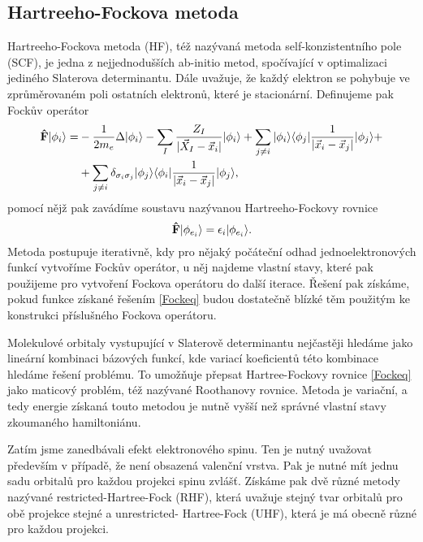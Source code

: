 \subsection{Hartreeho-Fockova metoda}
Hartreeho-Fockova metoda (HF), též nazývaná metoda self-konzistentního pole (SCF), je jedna z 
nejjednodušších ab-initio metod, spočívající v optimalizaci jediného Slaterova 
determinantu. Dále uvažuje, že každý elektron se pohybuje ve zprůměrovaném poli 
ostatních elektronů, které je stacionární.
Definujeme pak Fockův operátor
\begin{equation}
\begin{split}
\mathbf{\hat{F}}| \phi_{i} \rangle =& -\frac{1}{2m_e}\Delta| \phi_{i} \rangle
-\sum_{I} \frac{Z_{I}}{|\vec{X}_I - \vec{x}_i|}| \phi_{i} \rangle
+ \sum_{j \neq i} | \phi_{i} \rangle\langle \phi_{j} | \frac{1}{|\vec{x}_i - \vec{x}_j|} | \phi_{j} \rangle
+\\
&+ \sum_{j \neq i} \delta_{\sigma_i \sigma_{j}}| \phi_{j} \rangle\langle \phi_{i} | \frac{1}{|\vec{x}_i - \vec{x}_j|} | \phi_{j} \rangle,
\end{split}
\end{equation} 
pomocí nějž pak zavádíme soustavu nazývanou Hartreeho-Fockovy rovnice
\begin{equation}
\mathbf{\hat{F}}| \phi_{e_i} \rangle = \epsilon_i | \phi_{e_i} \rangle.\label{Fockeq}
\end{equation}
Metoda postupuje iterativně, kdy pro nějaký počáteční odhad jednoelektronových funkcí 
vytvoříme Fockův operátor, u něj najdeme vlastní stavy, které pak použijeme pro 
vytvoření Fockova operátoru do další iterace.
Řešení pak získáme, pokud funkce získané řešením \eqref{Fockeq} budou dostatečně blízké 
těm použitým ke konstrukci příslušného Fockova operátoru.

Molekulové orbitaly vystupující v Slaterově determinantu nejčastěji hledáme jako lineární
kombinaci bázových funkcí, kde variací koeficientů této kombinace hledáme řešení problému.
To umožňuje přepsat Hartree-Fockovy rovnice \eqref{Fockeq} jako maticový problém, též nazývané Roothanovy rovnice.
Metoda je variační, a tedy energie získaná touto metodou je nutně vyšší než 
správné vlastní stavy zkoumaného hamiltoniánu.

Zatím jsme zanedbávali efekt elektronového spinu. Ten je nutný uvažovat především v 
případě, že není obsazená valenční vrstva. Pak je nutné mít jednu sadu orbitalů pro 
každou projekci spinu zvlášť. Získáme pak dvě různé metody nazývané restricted-Hartree-Fock 
(RHF), která uvažuje stejný tvar orbitalů pro obě projekce stejné a unrestricted-
Hartree-Fock (UHF), která je má obecně různé pro každou projekci.


